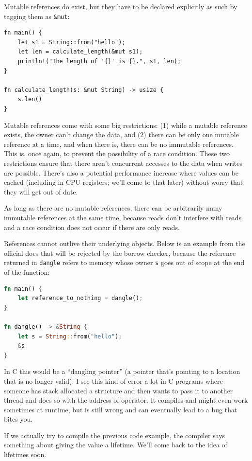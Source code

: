 \documentclass[a4paper]{report}
\begin{document}
Mutable references do exist, but they have to be declared explicitly as such by tagging them as \texttt{\&mut}:

\begin{lstlisting}
fn main() {
    let s1 = String::from("hello");
    let len = calculate_length(&mut s1);
    println!("The length of '{}' is {}.", s1, len);
}

fn calculate_length(s: &mut String) -> usize {
    s.len()
}
\end{lstlisting}

Mutable references come with  some big restrictions: (1) while a mutable reference exists, the owner can't change the data, and (2) there can be only one mutable reference at a time, and when there is, there can be no immutable references. This is, once again, to prevent the possibility of a race condition. These two restrictions ensure that there aren't concurrent accesses to the data when writes are possible. There's also a potential performance increase where values can be cached (including in CPU registers; we'll come to that later) without worry that they will get out of date.

As long as there are no mutable references, there can be arbitrarily many immutable references at the same time, because reads don't interfere with reads and a race condition does not occur if there are only reads. 

References cannot outlive their underlying objects. Below is an example from the official docs that will be rejected by the borrow checker, because the reference returned in \texttt{dangle} refers to memory whose owner \texttt{s} goes out of scope at the end of the function:

\begin{lstlisting}[language=Rust]
fn main() {
    let reference_to_nothing = dangle();
}

fn dangle() -> &String {
    let s = String::from("hello");
    &s
}
\end{lstlisting} 

In C this would be a ``dangling pointer'' (a pointer that's pointing to a location that is no longer valid). I see this kind of error a lot in C programs where someone has stack allocated a structure and then wants to pass it to another thread and does so with the address-of operator. It compiles and might even work sometimes at runtime, but is still wrong and can eventually lead to a bug that bites you. 

If we actually try to compile the previous code example, the compiler says something about giving the value a lifetime. We'll come back to the idea of lifetimes soon.
\end{document}
